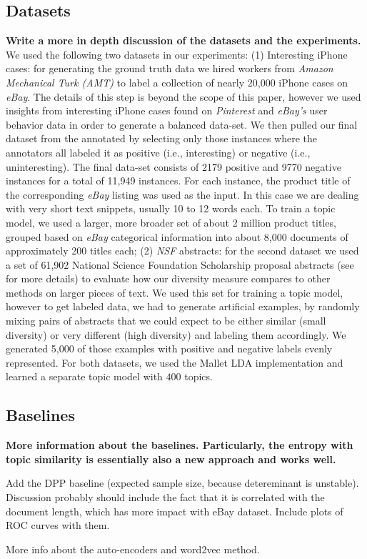 \subsection{Datasets}
\label{sec:datasets}
{\bf Write a more in depth discussion of the datasets and the  experiments. }
We used the following two datasets in our experiments: (1) Interesting iPhone cases:
for generating the ground truth data we hired workers from {\em Amazon Mechanical Turk (AMT)} to label a collection
of nearly 20,000 iPhone cases on {\em eBay}. The details of this step is beyond the scope of this paper, however we used insights from
interesting iPhone cases found on {\em Pinterest} and {\em eBay's} user behavior data in order to generate a balanced data-set. 
We then pulled our final dataset from the annotated by selecting only those instances where the annotators all labeled it as
positive (i.e., interesting) or negative (i.e., uninteresting). The final data-set consists of 2179 positive and 9770 negative instances for
a total of 11,949 instances. For each instance, the product title of
the corresponding {\em eBay} listing was used as the input. In this case we are
dealing with very short text snippets, usually 10 to 12 words each. To
train a topic model, we used a larger, more broader set of about
2 million product titles, grouped based on {\em eBay} categorical information into about 8,000
documents of approximately 200 titles each; (2) {\em NSF}
abstracts: for the second dataset we used a set of 61,902 National Science Foundation
Scholarship proposal abstracts (see~\cite{bache:2013} for more details) to evaluate how our diversity measure
compares to other methods on larger pieces of text. We used this set
for training a topic model, however to get labeled data, we had to
generate artificial examples, by randomly mixing pairs of abstracts that we
could expect to be either similar (small diversity) or very different
(high diversity) and labeling them accordingly. We generated 5,000 of
those examples with positive and negative labels evenly represented. For both datasets, we used the Mallet LDA implementation and learned a separate topic model with $400$ topics.

\subsection{Baselines}
\label{sec:baselines}
{\bf More information about the baselines. Particularly, the entropy
  with topic similarity is essentially also a new approach and works
  well. 

Add the DPP baseline (expected sample size, because detereminant is
unstable). Discussion probably
should include the fact that it is correlated with the document
length, which has more impact with eBay dataset. Include plots of ROC
curves with them.

More info about the auto-encoders and word2vec method.}

